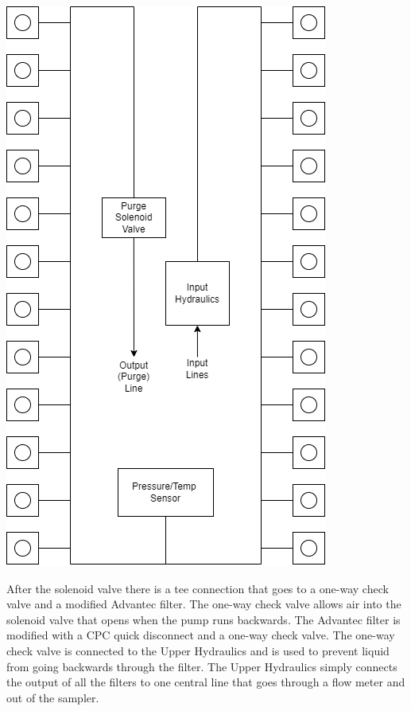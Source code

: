 \documentclass[11pt, letterpaper]{article}
\begin{document}
\begin{center}
	\includegraphics[scale=0.65, angle=-90]{./Assets/PolyWAG_HX_HD_LHR.png}
\end{center}

After the solenoid valve there is a tee connection that goes to a one-way check valve and a modified Advantec filter. The one-way check valve allows air into the solenoid valve that opens when the pump runs backwards. The Advantec filter is modified with a CPC quick disconnect and a one-way check valve. The one-way check valve is connected to the Upper Hydraulics and is used to prevent liquid from going backwards through the filter. The Upper Hydraulics simply connects the output of all the filters to one central line that goes through a flow meter and out of the sampler. 
\end{document}
